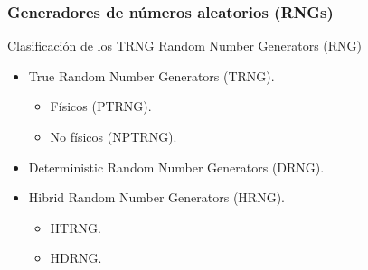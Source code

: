 \documentclass[10pt]{beamer}
\begin{document}
\begin{frame}
    \frametitle{Generadores de números aleatorios (RNGs)}
    \begin{block}{Clasificación de los TRNG}
        \justifying
        Random Number Generators (RNG)
        \begin{itemize}
            \item True Random Number Generators (TRNG).
            \begin{itemize}
                \item Físicos (PTRNG).
                \item No físicos (NPTRNG).
            \end{itemize}
            \item Deterministic Random Number Generators (DRNG).
            \item Hibrid Random Number Generators (HRNG).
            \begin{itemize}
                \item HTRNG.
                \item HDRNG.
            \end{itemize}
        \end{itemize}
	\end{block}
\end{frame}
\end{document}
